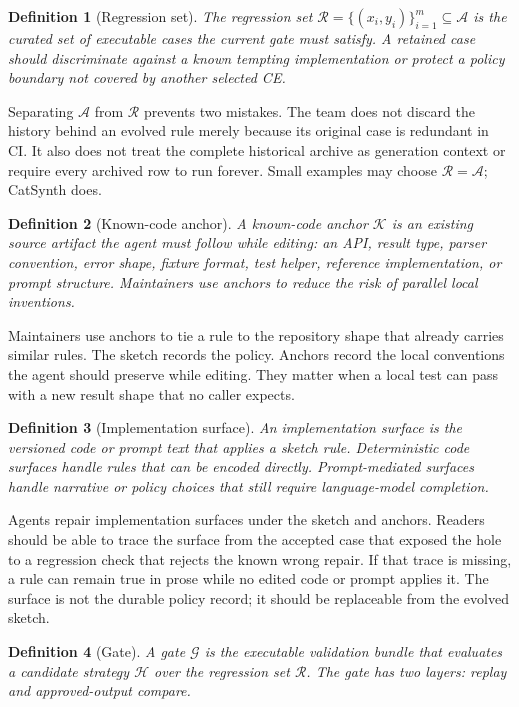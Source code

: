 \documentclass[11pt]{article}
\newtheorem{definition}{Definition}
\newcommand{\archive}{\mathcal{A}}
\newcommand{\regression}{\mathcal{R}}
\newcommand{\anchors}{\mathcal{K}}
\newcommand{\gate}{\mathcal{G}}
\newcommand{\strategy}{\mathcal{H}}
\begin{document}
\begin{definition}[Regression set]
The regression set $\regression = \{(x_i, y_i)\}_{i=1}^{m} \subseteq \archive$ is the curated
set of executable cases the current gate must satisfy.  A retained case should discriminate
against a known tempting implementation or protect a policy boundary not covered by another
selected CE.
\end{definition}

Separating $\archive$ from $\regression$ prevents two mistakes.  The team does not discard the
history behind an evolved rule merely because its original case is redundant in CI.  It also
does not treat the complete historical archive as generation context or require every archived
row to run forever.  Small examples may choose $\regression = \archive$; CatSynth does.

\begin{definition}[Known-code anchor]
A known-code anchor $\anchors$ is an existing source artifact the agent must follow while
editing: an API, result type, parser convention, error shape, fixture format, test helper,
reference implementation, or prompt structure.  Maintainers use anchors to reduce the risk of
parallel local inventions.
\end{definition}

Maintainers use anchors to tie a rule to the repository shape that already carries similar
rules.  The sketch records the policy.  Anchors record the local conventions the agent should
preserve while editing.  They matter when a local test can pass with a new result shape that no
caller expects.

\begin{definition}[Implementation surface]
An implementation surface is the versioned code or prompt text that applies a sketch rule.
Deterministic code surfaces handle rules that can be encoded directly.  Prompt-mediated
surfaces handle narrative or policy choices that still require language-model completion.
\end{definition}

Agents repair implementation surfaces under the sketch and anchors.  Readers should be able to
trace the surface from the accepted case that exposed the hole to a regression check that
rejects the known wrong repair.  If that trace is missing, a rule can remain true in prose while
no edited code or prompt applies it.  The surface is not the durable policy record; it should be
replaceable from the evolved sketch.

\begin{definition}[Gate]
A gate $\gate$ is the executable validation bundle that evaluates a candidate strategy
$\strategy$ over the regression set $\regression$.  The gate has two layers:
replay and approved-output compare.
\end{definition}
\end{document}
